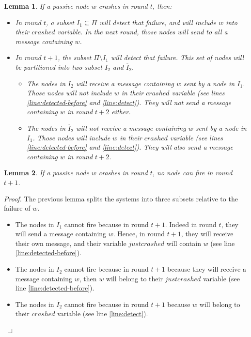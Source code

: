 \documentclass{article}
\newtheorem{lemma}{Lemma}
\begin{document}
\begin{lemma} \label{lem:split}
	If a passive node $w$ crashes in round $t$, then:
	\begin{itemize}
		\item In round $t$, a subset $I_1 \subseteq \Pi$ will detect that failure, and will include $w$ into their $crashed$ variable.
			In the next round, those nodes will send to all a message containing $w$.
		\item In round $t+1$, the subset $\Pi \setminus I_1$ will detect that failure. This set of nodes will be partitioned into two subset $I_2$ and $\overline{I}_2$.
		\begin{itemize}
			\item The nodes in $I_2$ will receive a message containing $w$ sent by a node in $I_1$. Those nodes will not include $w$ in their $crashed$ variable
				(see lines \ref{line:detected-before} and \ref{line:detect}).
				They will not send a message containing $w$ in round $t+2$ either.
			\item The nodes in $\overline{I}_2$ will not receive a message containing $w$ sent by a node in $I_1$. Those nodes will include $w$ in their $crashed$ variable
				(see lines \ref{line:detected-before} and \ref{line:detect}).
				They will also send a message containing $w$ in round $t+2$.
		\end{itemize}
	\end{itemize}
\end{lemma}

\begin{lemma} \label{lem:no-fire}
	If a passive node $w$ crashes in round $t$, no node can fire in round $t+1$.
\end{lemma}
\begin{proof}
	The previous lemma splits the systems into three subsets relative to the failure of $w$.
	\begin{itemize}
		\item The nodes in $I_1$ cannot fire because in round $t+1$. Indeed in round $t$, they will send a message containing $w$.
			Hence, in round $t+1$, they will receive their own message, and their variable $justcrashed$ will contain $w$ (see line \ref{line:detected-before}).
		\item The nodes in $I_2$ cannot fire because in round $t+1$ because they will receive a message containing $w$,
			then $w$ will belong to their $justcrashed$ variable (see line \ref{line:detected-before}).
		\item The nodes in $\overline{I}_2$ cannot fire because in round $t+1$ because $w$ will belong to their $crashed$ variable (see line \ref{line:detect}).
	\end{itemize}
\end{proof}
\end{document}
